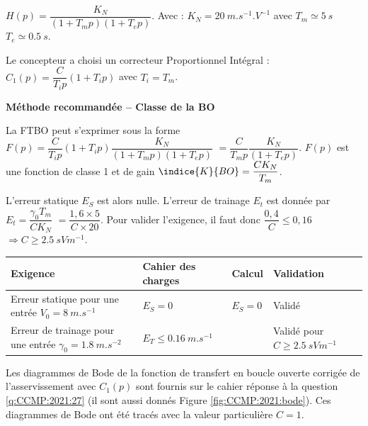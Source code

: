$H(p)=\dfrac{K_N}{\left(1+T_m p\right) \left(1+T_e p\right)}$. 
Avec : $K_N=\SI{20}{m.s^{-1}.V^{-1}}$ avec $T_m\simeq \SI{5}{s}$	$T_e\simeq\SI{0,5}{s}$.
 

Le concepteur a choisi un correcteur Proportionnel Intégral :	$C_1 (p)=\dfrac{C}{T_i p} \left(1+T_i p\right)$ avec $T_i=T_m$.
\fi

\ifprof
\begin{corrige}
\textbf{Méthode recommandée -- Classe de la BO}

La FTBO peut s'exprimer sous la forme $F(p)=\dfrac{C}{T_i p} \left(1+T_i p\right)\dfrac{K_N}{\left(1+T_m p\right) \left(1+T_e p\right)}$ $=\dfrac{C}{T_m p}\dfrac{K_N}{ \left(1+T_e p\right)}$. $F(p)$ est une fonction de classe 1 et de gain $\indice{K}{BO} = \dfrac{CK_N}{T_m} $.

L'erreur statique $E_S$ est alors nulle. L'erreur de trainage $E_t$ est donnée par  $E_t = \dfrac{\gamma_0 T_m}{C K_N}$ $ =\dfrac{1,6\times 5}{C \times 20}$. Pour valider l'exigence, il faut donc $\dfrac{0,4}{C} \leq 0,16 $
$\Rightarrow C\geq  \SI{2,5}{sVm^{-1}}$.

\begin{center}
\begin{tabular}{p{5cm}llp{3cm}}
\hline
Exigence & Cahier des charges & Calcul & Validation  \\
\hline
Erreur statique pour une entrée $V_0 = \SI{8}{m.s^{-1}}$ & $E_S=0$ & $E_S=0$ & Validé \\
Erreur de trainage pour une entrée $\gamma_0 = \SI{1,8}{m.s^{-2}}$ & $E_T\leq \SI{0,16}{m.s^{-1}}$ &  & Validé pour  $C\geq  \SI{2,5}{sVm^{-1}}$\\
\hline
\end{tabular}
\end{center} 
\end{corrige}
\else
\fi

\ifprof
\else
Les diagrammes de Bode de la fonction de transfert en boucle ouverte corrigée de l'asservissement avec $C_1 (p)$ sont fournis sur le cahier réponse à la question \ref{q:CCMP:2021:27} (il sont aussi donnés Figure \ref{fig:CCMP:2021:bode}). Ces diagrammes de Bode ont été tracés avec la valeur particulière $C=1$.
\fi

